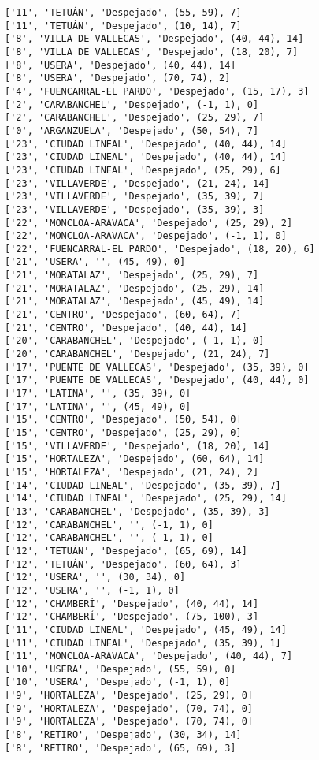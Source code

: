 \documentclass[11pt]{article}
\begin{document}
\begin{Verbatim}[commandchars=\\\{\}]
['11', 'TETUÁN', 'Despejado', (55, 59), 7]
['11', 'TETUÁN', 'Despejado', (10, 14), 7]
['8', 'VILLA DE VALLECAS', 'Despejado', (40, 44), 14]
['8', 'VILLA DE VALLECAS', 'Despejado', (18, 20), 7]
['8', 'USERA', 'Despejado', (40, 44), 14]
['8', 'USERA', 'Despejado', (70, 74), 2]
['4', 'FUENCARRAL-EL PARDO', 'Despejado', (15, 17), 3]
['2', 'CARABANCHEL', 'Despejado', (-1, 1), 0]
['2', 'CARABANCHEL', 'Despejado', (25, 29), 7]
['0', 'ARGANZUELA', 'Despejado', (50, 54), 7]
['23', 'CIUDAD LINEAL', 'Despejado', (40, 44), 14]
['23', 'CIUDAD LINEAL', 'Despejado', (40, 44), 14]
['23', 'CIUDAD LINEAL', 'Despejado', (25, 29), 6]
['23', 'VILLAVERDE', 'Despejado', (21, 24), 14]
['23', 'VILLAVERDE', 'Despejado', (35, 39), 7]
['23', 'VILLAVERDE', 'Despejado', (35, 39), 3]
['22', 'MONCLOA-ARAVACA', 'Despejado', (25, 29), 2]
['22', 'MONCLOA-ARAVACA', 'Despejado', (-1, 1), 0]
['22', 'FUENCARRAL-EL PARDO', 'Despejado', (18, 20), 6]
['21', 'USERA', '', (45, 49), 0]
['21', 'MORATALAZ', 'Despejado', (25, 29), 7]
['21', 'MORATALAZ', 'Despejado', (25, 29), 14]
['21', 'MORATALAZ', 'Despejado', (45, 49), 14]
['21', 'CENTRO', 'Despejado', (60, 64), 7]
['21', 'CENTRO', 'Despejado', (40, 44), 14]
['20', 'CARABANCHEL', 'Despejado', (-1, 1), 0]
['20', 'CARABANCHEL', 'Despejado', (21, 24), 7]
['17', 'PUENTE DE VALLECAS', 'Despejado', (35, 39), 0]
['17', 'PUENTE DE VALLECAS', 'Despejado', (40, 44), 0]
['17', 'LATINA', '', (35, 39), 0]
['17', 'LATINA', '', (45, 49), 0]
['15', 'CENTRO', 'Despejado', (50, 54), 0]
['15', 'CENTRO', 'Despejado', (25, 29), 0]
['15', 'VILLAVERDE', 'Despejado', (18, 20), 14]
['15', 'HORTALEZA', 'Despejado', (60, 64), 14]
['15', 'HORTALEZA', 'Despejado', (21, 24), 2]
['14', 'CIUDAD LINEAL', 'Despejado', (35, 39), 7]
['14', 'CIUDAD LINEAL', 'Despejado', (25, 29), 14]
['13', 'CARABANCHEL', 'Despejado', (35, 39), 3]
['12', 'CARABANCHEL', '', (-1, 1), 0]
['12', 'CARABANCHEL', '', (-1, 1), 0]
['12', 'TETUÁN', 'Despejado', (65, 69), 14]
['12', 'TETUÁN', 'Despejado', (60, 64), 3]
['12', 'USERA', '', (30, 34), 0]
['12', 'USERA', '', (-1, 1), 0]
['12', 'CHAMBERÍ', 'Despejado', (40, 44), 14]
['12', 'CHAMBERÍ', 'Despejado', (75, 100), 3]
['11', 'CIUDAD LINEAL', 'Despejado', (45, 49), 14]
['11', 'CIUDAD LINEAL', 'Despejado', (35, 39), 1]
['11', 'MONCLOA-ARAVACA', 'Despejado', (40, 44), 7]
['10', 'USERA', 'Despejado', (55, 59), 0]
['10', 'USERA', 'Despejado', (-1, 1), 0]
['9', 'HORTALEZA', 'Despejado', (25, 29), 0]
['9', 'HORTALEZA', 'Despejado', (70, 74), 0]
['9', 'HORTALEZA', 'Despejado', (70, 74), 0]
['8', 'RETIRO', 'Despejado', (30, 34), 14]
['8', 'RETIRO', 'Despejado', (65, 69), 3]

\end{Verbatim}
\end{document}
